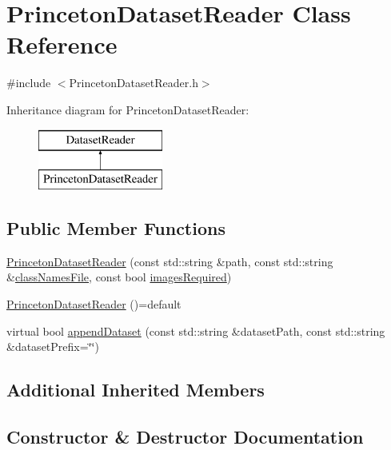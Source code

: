 \hypertarget{class_princeton_dataset_reader}{}\section{Princeton\+Dataset\+Reader Class Reference}
\label{class_princeton_dataset_reader}


{\ttfamily \#include $<$Princeton\+Dataset\+Reader.\+h$>$}

Inheritance diagram for Princeton\+Dataset\+Reader\+:\begin{figure}[H]
\begin{center}
\leavevmode
\includegraphics[height=2.000000cm]{class_princeton_dataset_reader}
\end{center}
\end{figure}
\subsection*{Public Member Functions}
\begin{DoxyCompactItemize}
\item 
\hyperlink{class_princeton_dataset_reader_ae488c4a477246dea380c715f04f39009}{Princeton\+Dataset\+Reader} (const std\+::string \&path, const std\+::string \&\hyperlink{class_dataset_reader_a45ded43b56539f1e37a24ca9c94b4611}{class\+Names\+File}, const bool \hyperlink{class_dataset_reader_a71d04d25d58e0e9a0c05d69afcff03a1}{images\+Required})
\item 
\hyperlink{class_princeton_dataset_reader_a2402d825ffb72fddd54c0576bc5e2866}{Princeton\+Dataset\+Reader} ()=default
\item 
virtual bool \hyperlink{class_princeton_dataset_reader_a078bdc2105cbef10ce0dc8c2fd12923e}{append\+Dataset} (const std\+::string \&dataset\+Path, const std\+::string \&dataset\+Prefix=\char`\"{}\char`\"{})
\end{DoxyCompactItemize}
\subsection*{Additional Inherited Members}


\subsection{Constructor \& Destructor Documentation}
\mbox{\label{class_princeton_dataset_reader_ae488c4a477246dea380c715f04f39009}} 
